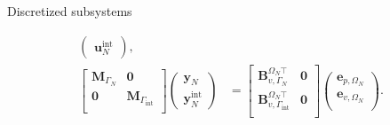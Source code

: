 \documentclass[aspectratio=169]{ISAE-Beamer}
\renewcommand{\div}{\operatorname{div}}
\begin{document}
\begin{frame}{Discretized subsystems}
\begin{tcolorbox}[colframe=red,title=Subdomain $\Omega_N$ (I.B.P. $\div$), coltitle=white]
\begin{equation*}
\begin{aligned}
\begin{pmatrix}
	\mathbf{u}_N^{\text{int}}
	\end{pmatrix}, \\
	\begin{bmatrix}
	\mathbf{M}_{\Gamma_N} & \mathbf{0} \\
	\mathbf{0} & \mathbf{M}_{\Gamma_{\text{int}}} \\
	\end{bmatrix}
	\begin{pmatrix}
	\mathbf{y}_N \\
	\mathbf{y}_N^{\text{int}}
	\end{pmatrix} &=
	\begin{bmatrix}
	\mathbf{B}_{v, \Gamma_{N}}^{\Omega_N \top} & \mathbf{0} \\ 
	\mathbf{B}_{v, \Gamma_{\text{int}}}^{\Omega_N \top} & \mathbf{0}\\ 
	\end{bmatrix}
	\begin{pmatrix}
	{\mathbf{e}}_{p, \Omega_N} \\
	{\mathbf{e}}_{v, \Omega_N} \\
	\end{pmatrix}.
	\end{aligned}
	\end{equation*}
\end{tcolorbox}
\end{frame}
\end{document}
